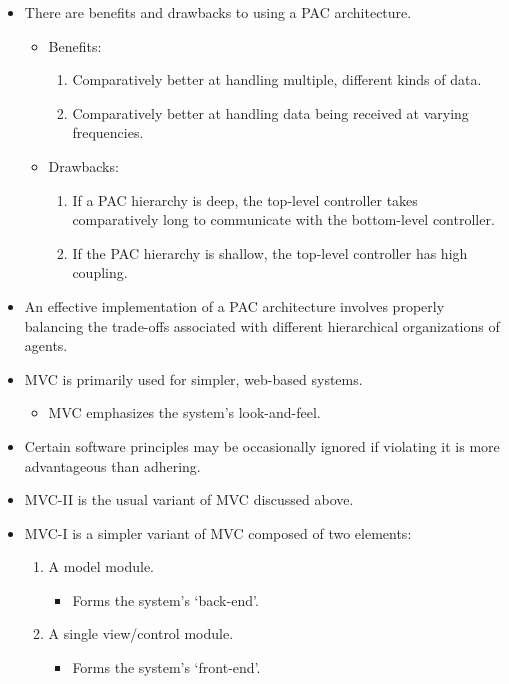 \documentclass{article}
\begin{document}
\begin{itemize}
\begin{itemize}
	\end{itemize}
	\item There are benefits and drawbacks to using a PAC architecture.
	\begin{itemize}
		\item Benefits:
		\begin{enumerate}
			\item Comparatively better at handling multiple, different kinds of data.
			\item Comparatively better at handling data being received at varying frequencies.
		\end{enumerate}
		\item Drawbacks:
		\begin{enumerate}
			\item If a PAC hierarchy is deep, the top-level controller takes comparatively long to communicate with the bottom-level controller.
			\item If the PAC hierarchy is shallow, the top-level controller has high coupling.
		\end{enumerate}
	\end{itemize}
	\item An effective implementation of a PAC architecture involves properly balancing the trade-offs associated with different hierarchical organizations of agents.
	\item MVC is primarily used for simpler, web-based systems.
	\begin{itemize}
		\item MVC emphasizes the system's look-and-feel.
	\end{itemize}
	\item Certain software principles may be occasionally ignored if violating it is more advantageous than adhering.
	\item MVC-II is the usual variant of MVC discussed above.
	\item MVC-I is a simpler variant of MVC composed of two elements:
	\begin{enumerate}
		\item A model module.
		\begin{itemize}
			\item Forms the system's `back-end'.
		\end{itemize}
		\item A single view/control module.
		\begin{itemize}
			\item Forms the system's `front-end'.
		\end{itemize}

\end{enumerate}
\end{itemize}
\end{document}
